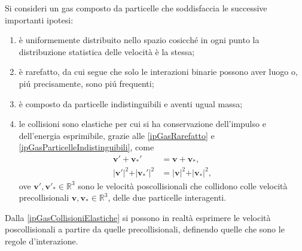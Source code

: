         \begin{ipo}
          \label{ipGasPerfetto}
          Si consideri un gas composto da particelle che soddisfaccia le successive importanti ipotesi:

          \begin{enumerate}[
            label=G\arabic*,
            leftmargin=2em,
          ]
            \item\label{ipGasOmogeneo} è uniformemente distribuito nello spazio cosicché in ogni punto la distribuzione statistica delle velocità è la stessa;
            \item\label{ipGasRarefatto} è rarefatto, da cui segue che solo le interazioni binarie possono aver luogo o, piú precisamente, sono piú frequenti;
            \item\label{ipGasParticelleIndistinguibili} è composto da particelle indistinguibili e aventi ugual massa;
            \item\label{ipGasCollisioniElastiche} le collisioni sono elastiche per cui si ha conservazione dell'impulso e dell'energia esprimibile, grazie alle \ref{ipGasRarefatto} e \ref{ipGasParticelleIndistinguibili}, come
            \begin{align}
              \mathbf v'+\mathbf v_*'
              &=\mathbf v+\mathbf v_*,
              \label{eqConservazioneImpulso}\tag{CI}\\
              \vert\mathbf v'\vert^2+\vert \mathbf v_*'\vert^2&=
              \vert\mathbf v\vert^2+\vert \mathbf v_*\vert^2,
              \label{eqConservazioneEnergia}\tag{CE}
            \end{align}
            ove \(\mathbf v',\mathbf v'_*\in\mathbb R^3\) sono le velocità poscollisionali che collidono colle velocità precollisionali \(\mathbf v,\mathbf v_*\in\mathbb R^3\), delle due particelle interagenti\footnotemark{}.
          \end{enumerate}
        \end{ipo}

        Dalla \ref{ipGasCollisioniElastiche} si possono in realtà esprimere le velocità poscollisionali a partire da quelle precollisionali, definendo quelle che sono le regole d'interazione.

